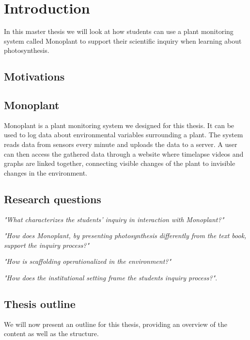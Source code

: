 \chapter{Introduction}
In this master thesis we will look at how students can use a plant monitoring system called Monoplant to support their scientific inquiry when learning about photosynthesis.

\section{Motivations}



\section{Monoplant}
Monoplant is a plant monitoring system we designed for this thesis. It can be used to log data about environmental variables surrounding a plant. The system reads data from sensors every minute and uploads the data to a server. A user can then access the gathered data through a website where timelapse videos and graphs are linked together, connecting visible changes of the plant to invisible changes in the environment.

\section{Research questions}

\emph{"What characterizes the students’ inquiry in interaction with Monoplant?"}

\emph{"How does Monoplant, by presenting photosynthesis differently from the text book, support the inquiry process?"}

\emph{"How is scaffolding operationalized in the environment?"}

\emph{"How does the institutional setting frame the students inquiry process?"}.

\section{Thesis outline}
We will now present an outline for this thesis, providing an overview of the content as well as the structure. 

